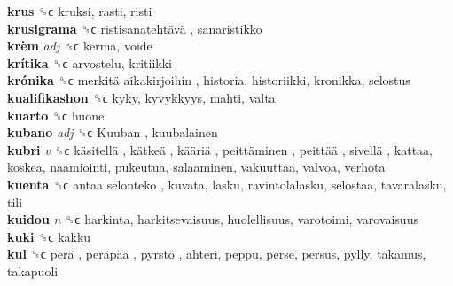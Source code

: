 \textbf{krus} ␝ϲ  kruksi, rasti, risti  \\
\textbf{krusigrama} ␝ϲ   ristisanatehtävä , sanaristikko  \\
\textbf{krèm} \emph{adj}  ␝ϲ  kerma, voide  \\
\textbf{krítika} ␝ϲ  arvostelu, kritiikki  \\
\textbf{krónika} ␝ϲ   merkitä aikakirjoihin , historia, historiikki, kronikka, selostus  \\
\textbf{kualifikashon} ␝ϲ  kyky, kyvykkyys, mahti, valta  \\
\textbf{kuarto} ␝ϲ  huone  \\
\textbf{kubano} \emph{adj}  ␝ϲ   Kuuban , kuubalainen  \\
\textbf{kubri} \emph{v}  ␝ϲ   käsitellä ,  kätkeä ,  kääriä ,  peittäminen ,  peittää ,  sivellä , kattaa, koskea, naamiointi, pukeutua, salaaminen, vakuuttaa, valvoa, verhota  \\
\textbf{kuenta} ␝ϲ   antaa selonteko , kuvata, lasku, ravintolalasku, selostaa, tavaralasku, tili  \\
\textbf{kuidou} \emph{n}  ␝ϲ  harkinta, harkitsevaisuus, huolellisuus, varotoimi, varovaisuus  \\
\textbf{kuki} ␝ϲ  kakku  \\
\textbf{kul} ␝ϲ   perä ,  peräpää ,  pyrstö , ahteri, peppu, perse, persus, pylly, takamus, takapuoli  \\
